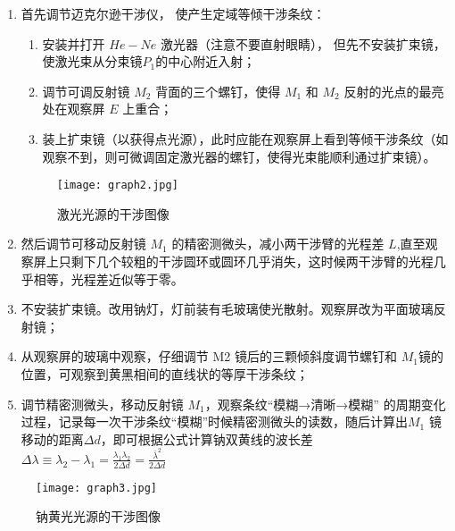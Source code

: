 \documentclass[dvipsnames, svgnames,a4paper,11pt]{article}
\begin{document}
		\begin{enumerate}
			\item 首先调节迈克尔逊干涉仪， 使产生定域等倾干涉条纹：
			
				\begin{enumerate}[label=\roman*.]
					\item 安装并打开 $He-Ne$ 激光器（注意不要直射眼睛）， 但先不安装扩束镜， 使激光束从分束镜$ P_1$的中心附近入射；
					
					\item 调节可调反射镜 $M_2$ 背面的三个螺钉，使得 $M_1$ 和 $M_2$ 反射的光点的最亮处在观察屏 $E$ 上重合；
					
					
					\item 装上扩束镜（以获得点光源），此时应能在观察屏上看到等倾干涉条纹（如观察不到，则可微调固定激光器的螺钉，使得光束能顺利通过扩束镜）。
				\end{enumerate}
				
				\begin{figure}[htbp]
					\centering
					\texttt{[image: graph2.jpg]}
					\caption{激光光源的干涉图像}
					\label{fig:graph2}
				\end{figure}
			
			\item 然后调节可移动反射镜 $M_1$ 的精密测微头，减小两干涉臂的光程差 $L$,直至观察屏上只剩下几个较粗的干涉圆环或圆环几乎消失，这时候两干涉臂的光程几乎相等，光程差近似等于零。
			
			\item 不安装扩束镜。改用钠灯，灯前装有毛玻璃使光散射。观察屏改为平面玻璃反射镜；
			
			\item 从观察屏的玻璃中观察，仔细调节 M2 镜后的三颗倾斜度调节螺钉和 $M_1$镜的位置，可观察到黄黑相间的直线状的等厚干涉条纹；
			
			\item 调节精密测微头，移动反射镜 $M_1$，观察条纹“模糊→清晰→模糊” 的周期变化过程，记录每一次干涉条纹“模糊”时候精密测微头的读数，随后计算出$M_1$ 镜移动的距离$\Delta d$，即可根据公式计算钠双黄线的波长差$\Delta \lambda\equiv\lambda_2-\lambda_1=\frac{\lambda_1\lambda_2}{2\Delta d}=\frac{\bar{\lambda}^2}{2\Delta d} $

		\end{enumerate}
		
		\begin{figure}[htbp]
			\centering
			\texttt{[image: graph3.jpg]}
			\caption{钠黄光光源的干涉图像}
			\label{fig:graph3}
		\end{figure}
		
\end{document}
